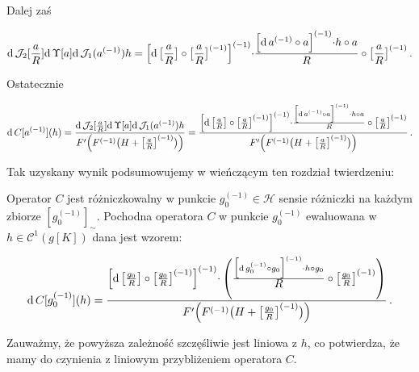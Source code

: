 Dalej zaś

\begin{align*}
	\mathrm{d}\, \mathcal{J}_2 [\frac{a}{R}]  \mathrm{d}\, \Upsilon  [a]  \mathrm{d}\, \mathcal{J}_1(a^{(-1)}) h = \Bigl[\mathrm{d}\,\big[\frac{a}{R}\big] \circ \big[ \frac{a}{R}\big]^{(-1)}\Bigl]^{(-1)} \cdot \frac{\Bigl[\mathrm{d}\,a^{(-1)} \circ a\Bigl]^{(-1)} \cdot h \circ a}{R} \circ \big[ \frac{a}{R}\big]^{(-1)}\,.
\end{align*}

Ostatecznie 

\begin{align*}
	\mathrm{d}\, C[a^{(-1)}](h) = \frac{\mathrm{d}\, \mathcal{J}_2 [\frac{a}{R}]  \mathrm{d}\, \Upsilon  [a]  \mathrm{d}\, \mathcal{J}_1(a^{(-1)}) h}{F'\Bigl( F^{(-1)}\bigl( H + \big[ \frac{a}{R}\big]^{(-1)} \bigl) \Bigl)} = \frac{\Bigl[\mathrm{d}\,\big[\frac{a}{R}\big] \circ \big[ \frac{a}{R}\big]^{(-1)}\Bigl]^{(-1)} \cdot \frac{\Bigl[\mathrm{d}\,a^{(-1)} \circ a\Bigl]^{(-1)} \cdot h \circ a}{R} \circ \big[ \frac{a}{R}\big]^{(-1)}}{F'\Bigl( F^{(-1)}\bigl( H + \big[ \frac{a}{R}\big]^{(-1)} \bigl) \Bigl)}\,.
\end{align*}

Tak uzyskany wynik podsumowujemy w wieńczącym ten rozdział twierdzeniu:

\begin{tw}\label{on_C_diff_final}
	Operator $C$ jest różniczkowalny w punkcie $g_0^{(-1)} \in \mathcal{H}$ sensie różniczki na każdym zbiorze $[g_{0}^{(-1)}]_{\sim}$. Pochodna operatora $ C $ w punkcie $ g_0^{(-1)}$ ewaluowana w $ h \in \mathcal{C}^{1}(g[K]) $ dana jest wzorem:
	
\begin{equation*}
\mathrm{d}\, C[g_{0}^{(-1)}](h) = \frac{\Bigl[\mathrm{d}\,\big[\frac{g_{0}}{R}\big] \circ \big[ \frac{g_{0}}{R}\big]^{(-1)}\Bigl]^{(-1)} \cdot \left( \frac{\Bigl[\mathrm{d}\,g_{0}^{(-1)} \circ g_{0}\Bigl]^{(-1)} \cdot h \circ g_{0}}{\mathlarger{R}} \circ \big[ \frac{g_{0}}{R}\big]^{(-1)}\right)}{F'\Bigl( F^{(-1)}\bigl( H + \big[ \frac{g_{0}}{R}\big]^{(-1)} \bigl) \Bigl)}\,.
\end{equation*}
\end{tw}

Zauważmy, że powyższa zależność szczęśliwie jest liniowa z $h$, co potwierdza, że mamy do czynienia z liniowym przybliżeniem operatora $C$.




